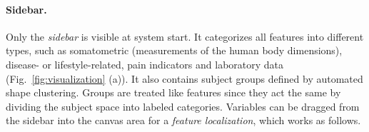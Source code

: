\documentclass[journal]{style/vgtc} 			          %
\begin{document}
\paragraph{Sidebar.}
Only the \emph{sidebar} is visible at system start.
%
It categorizes all features into different types, such as somatometric (measurements of the human body dimensions), disease- or lifestyle-related, pain indicators and laboratory data (Fig.~\ref{fig:visualization} (a)).
%
It also contains subject groups defined by automated shape clustering.
%
Groups are treated like features since they act the same by dividing the subject space into labeled categories.
%
Variables can be dragged from the sidebar into the canvas area for a \emph{feature localization}, which works as follows.
%
\end{document}
